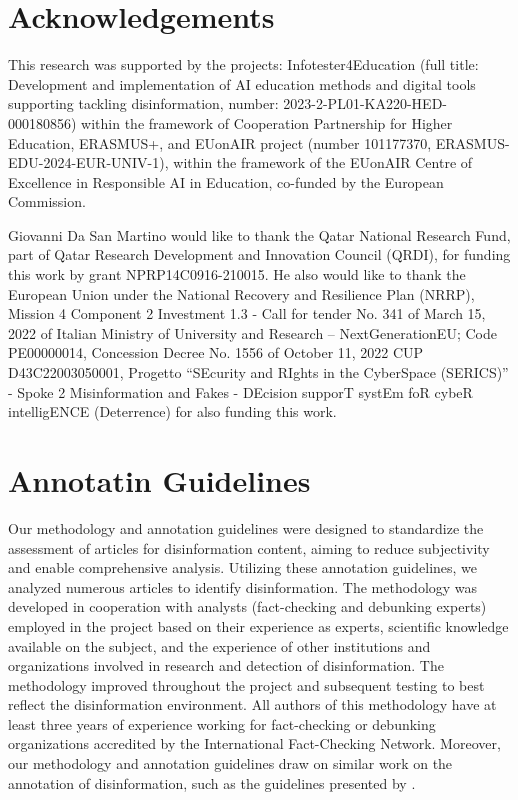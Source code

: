 \documentclass[11pt]{article}
\begin{document}
\section*{Acknowledgements}

This research was supported by the projects: Infotester4Education (full title: Development and implementation of AI education methods and digital tools supporting tackling disinformation, number:  2023-2-PL01-KA220-HED-000180856) within the framework of Cooperation Partnership for Higher Education, ERASMUS+, and EUonAIR project (number 101177370, ERASMUS-EDU-2024-EUR-UNIV-1), within the framework of the EUonAIR Centre of Excellence in Responsible AI in Education, co-funded by the European Commission.

Giovanni Da San Martino would like to thank the Qatar National Research Fund, part of Qatar Research Development and Innovation Council (QRDI), for funding this work  by grant NPRP14C0916-210015. 
He also would like to thank the European Union under the National Recovery and Resilience Plan (NRRP), Mission 4 Component 2 Investment 1.3 - Call for tender No. 341 of March 15, 2022 of Italian Ministry of University and Research – NextGenerationEU; Code PE00000014, Concession Decree No. 1556 of October 11, 2022 CUP D43C22003050001, Progetto ``SEcurity and RIghts in the CyberSpace (SERICS)'' - Spoke 2 Misinformation and Fakes - DEcision supporT systEm foR cybeR intelligENCE (Deterrence) for also funding this work. 


%
% 


\appendix

\section{Annotatin Guidelines}
\label{appendix:guidelines}



Our methodology and annotation guidelines were designed to standardize the assessment of articles for disinformation content, aiming to reduce subjectivity and enable comprehensive analysis. Utilizing these annotation guidelines, we analyzed numerous articles to identify disinformation. The methodology was developed in cooperation with analysts (fact-checking and debunking experts) employed in the project based on their experience as experts, scientific knowledge available on the subject, and the experience of other institutions and organizations involved in research and detection of disinformation. The methodology improved throughout the project and subsequent testing to best reflect the disinformation environment. All authors of this methodology have at least three years of experience working for fact-checking or debunking organizations accredited by the International Fact-Checking Network. Moreover, our methodology and annotation guidelines draw on similar work on the annotation of disinformation, such as the guidelines presented by \citet{modzelewski2024mipd}.
\end{document}

